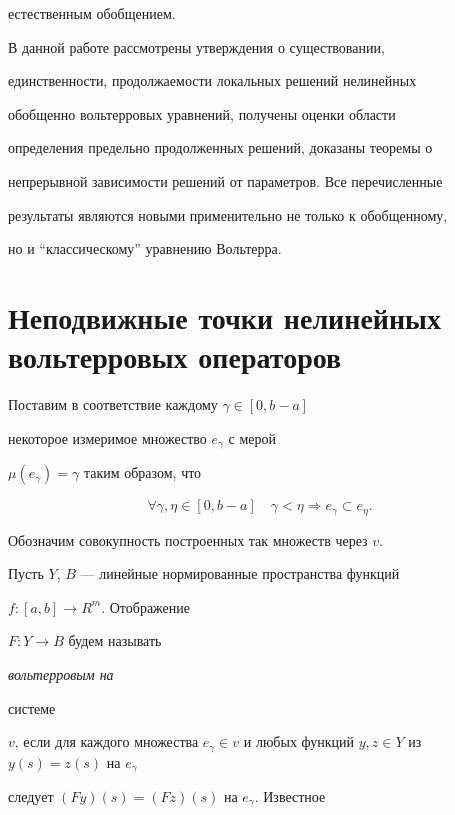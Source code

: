 естественным обобщением.





В данной работе рассмотрены утверждения о существовании,


единственности, продолжаемости локальных решений нелинейных


обобщенно вольтерровых уравнений, получены оценки области


определения предельно продолженных решений, доказаны теоремы о


непрерывной зависимости решений от параметров. Все перечисленные


результаты являются новыми применительно не только к обобщенному,


но и ``классическому'' уравнению Вольтерра.








\section{Неподвижные точки нелинейных вольтерровых операторов}





Поставим в соответствие каждому $\gamma \in [0, b-a]$


некоторое измеримое множество $e_{\gamma}$ с мерой


$\mu (e_{\gamma})=\gamma$ таким образом, что


\begin{equation}\label{b0}


\forall \gamma, \eta \in [0, b-a] \quad \gamma < \eta


\Rightarrow e_{\gamma} \subset e_{\eta}.


\end{equation}


Обозначим совокупность построенных так множеств через $v$.


Пусть $Y$, $B$ --- линейные нормированные пространства функций


$f:[a,b] \to R^{m}$. Отображение


$F:Y \to B$ будем называть {\it вольтерровым на


системе} $v$, если для каждого множества $e_{\gamma}


\in v$ и любых функций $y,z\in Y$ из $y (s)=z (s)$ на $e_{\gamma}$


следует $(F y)(s)=(F z)(s)$ на $e_{\gamma}$. Известное


